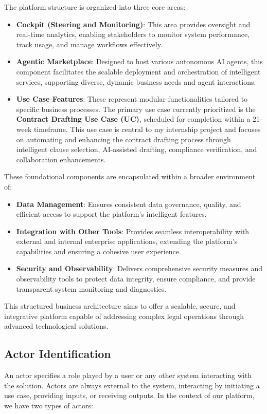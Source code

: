The platform structure is organized into three core areas:

\begin{itemize}
\item \textbf{Cockpit (Steering and Monitoring)}: This area provides oversight and real-time analytics, enabling stakeholders to monitor system performance, track usage, and manage workflows effectively.
\item \textbf{Agentic Marketplace}: Designed to host various autonomous AI agents, this component facilitates the scalable deployment and orchestration of intelligent services, supporting diverse, dynamic business needs and agent interactions.
\item \textbf{Use Case Features}: These represent modular functionalities tailored to specific business processes. The primary use case currently prioritized is the \textbf{Contract Drafting Use Case (UC)}, scheduled for completion within a 21-week timeframe. This use case is central to my internship project and focuses on automating and enhancing the contract drafting process through intelligent clause selection, AI-assisted drafting, compliance verification, and collaboration enhancements.
\end{itemize}

These foundational components are encapsulated within a broader environment of:

\begin{itemize}
\item \textbf{Data Management}: Ensures consistent data governance, quality, and efficient access to support the platform's intelligent features.
\item \textbf{Integration with Other Tools}: Provides seamless interoperability with external and internal enterprise applications, extending the platform's capabilities and ensuring a cohesive user experience.
\item \textbf{Security and Observability}: Delivers comprehensive security measures and observability tools to protect data integrity, ensure compliance, and provide transparent system monitoring and diagnostics.
\end{itemize}

This structured business architecture aims to offer a scalable, secure, and integrative platform capable of addressing complex legal operations through advanced technological solutions.

\subsection{Actor Identification}
An actor specifies a role played by a user or any other system interacting with the solution. Actors are always external to the system, interacting by initiating a use case, providing inputs, or receiving outputs. In the context of our platform, we have two types of actors:

